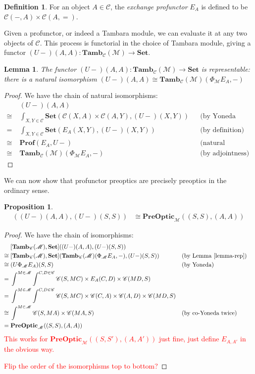 \documentclass[11pt,a4paper]{article}
\theoremstyle{plain}
\newtheorem{proposition}[theorem]{Proposition}
\newtheorem{lemma}[theorem]{Lemma}
\theoremstyle{definition}
\newtheorem{definition}[theorem]{Definition}
\newcommand{\C}{\mathscr{C}}
\newcommand{\M}{\mathscr{M}}
\newcommand{\Pastro}{\Phi}
\newcommand{\Set}{\mathbf{Set}}
\newcommand{\Prof}{\mathbf{Prof}}
\newcommand{\PreOptic}{\mathbf{PreOptic}}
\newcommand{\Tamb}{\mathbf{Tamb}}
\newcommand{\todo}[1]{\textcolor{red}{\small #1}}
\begin{document}
\begin{definition}
For an object $A \in \C$, the \emph{exchange profunctor} $E_A$ is defined to be $\C(-, A) \times \C(A, {=})$.
\end{definition}

Given a profunctor, or indeed a Tambara module, we can evaluate it at any two objects of $\C$. This process is functorial in the choice of Tambara module, giving a functor $(U-)(A,A) : \Tamb_\C(\M) \to \Set$.

\begin{lemma}
\label{lemma-rep}
The functor $(U-)(A,A) : \Tamb_\C(\M) \to \Set$ is representable: there is a natural isomorphism
$(U-)(A,A) \cong \Tamb_\C(\M)(\Pastro_\M E_A, -)$
\end{lemma}
\begin{proof}
We have the chain of natural isomorphisms:
\begin{align*}
&(U-)(A,A) \\
\cong \;&\int_{X,Y \in \C} \Set(\C(X,A) \times \C(A,Y), (U-)(X,Y)) && \text{(by Yoneda (un)reduction twice)} \\
=\;&\int_{X,Y \in \C} \Set(E_A(X,Y), (U-)(X,Y)) && \text{(by definition)}\\
\cong \;&\Prof(E_A, U-) && \text{(natural transformations as ends)} \\
\cong \;&\Tamb_\C(\M)(\Pastro_\M E_A, -) && \text{(by adjointness)} 
\end{align*}
\end{proof}

We can now show that profunctor preoptics are precisely preoptics in the ordinary sense.

\begin{proposition}
\label{prop-profunctor-optics-are-optics}
\begin{align*}
[\Tamb_\C(\M), \Set]((U-)(A,A),(U-)(S,S)) &\cong \PreOptic_\M((S, S), (A, A))
\end{align*}
\end{proposition}
\begin{proof}
We have the chain of isomorphisms:
\begin{align*}
&[\Tamb_\C(\M), \Set]((U-)(A,A),(U-)(S,S)) \\
\cong \;&[\Tamb_\C(\M), \Set](\Tamb_\C(\M)(\Pastro_\M E_A, -), (U-)(S,S))  && \text{(by Lemma \ref{lemma-rep})}\\
\cong \;&(U\Pastro_\M E_A)(S,S)  && \text{(by Yoneda)} \\
= \;&\int^{M \in \M} \int^{C,D \in \C} \C(S, MC) \times E_A(C,D) \times \C(MD,S) \\
= \;&\int^{M \in \M} \int^{C,D \in \C} \C(S, MC) \times \C(C,A) \times \C(A,D) \times \C(MD,S) \\
\cong \;&\int^{M \in \M} \C(S, MA) \times \C(MA, S)  && \text{(by co-Yoneda twice)} \\
= \;&\PreOptic_\M((S, S), (A, A))
\end{align*}
\todo{This works for $\PreOptic_\M((S, S'), (A, A'))$ just fine, just define $E_{A,A'}$ in the obvious way.}

\todo{Flip the order of the isomorphisms top to bottom?}
\end{proof}
\end{document}
